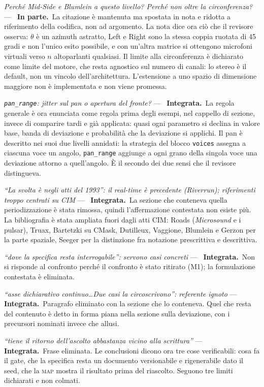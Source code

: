 \documentclass[11pt,a4paper]{article}
\newcommand{\integrata}{\textbf{Integrata.}}
\newcommand{\parziale}{\textbf{In parte.}}
\newenvironment{rilievi}
  {\begin{list}{}{%
    \setlength{\leftmargin}{1.6em}\setlength{\itemindent}{-1.6em}%
    \setlength{\itemsep}{4pt}\setlength{\parsep}{0pt}\setlength{\topsep}{4pt}}}
  {\end{list}}
\newcommand{\voce}[1]{\item \textit{#1} ---\ }
\begin{document}
\begin{rilievi}
\voce{Perché Mid-Side e Blumlein a questo livello? Perché non oltre la
circonferenza?} \parziale\ La citazione è mantenuta ma spostata in nota e
ridotta a riferimento della codifica, non ad argomento. La nota dice ora
ciò che il revisore osserva: $\theta$ è un azimuth astratto, Left e Right
sono la stessa coppia ruotata di 45 gradi e non l'unico esito possibile, e
con un'altra matrice si ottengono microfoni virtuali verso $n$ altoparlanti
qualsiasi. Il limite alla circonferenza è dichiarato come limite del motore,
che resta agnostico sul numero di canali: lo stereo è il default, non un
vincolo dell'architettura. L'estensione a uno spazio di dimensione maggiore
non è implementata e non viene promessa.

\voce{\texttt{pan\_range}: jitter sul pan o apertura del fronte?}
\integrata\ La regola generale è ora enunciata come regola prima degli
esempi, nel cappello di sezione, invece di comparire tardi e già applicata:
quasi ogni parametro si declina in valore base, banda di deviazione e
probabilità che la deviazione si applichi. Il pan è descritto nei suoi due
livelli annidati: la strategia del blocco \texttt{voices} assegna a ciascuna
voce un angolo, \texttt{pan\_range} aggiunge a ogni grano della singola voce
una deviazione attorno a quell'angolo. È il secondo dei due sensi che il
revisore distingueva.

\voce{``La svolta è negli atti del 1993'': il real-time è precedente
(Riverrun); riferimenti troppo centrati su CIM} \integrata\ La sezione che
conteneva quella periodizzazione è stata rimossa, quindi l'affermazione
contestata non esiste più. La bibliografia è stata ampliata fuori dagli atti
CIM: Roads (\emph{Microsound} e i pulsar), Truax, Bartetzki su CMask,
Dutilleux, Vaggione, Blumlein e Gerzon per la parte spaziale, Seeger per la
distinzione fra notazione prescrittiva e descrittiva.

\voce{``dove la specifica resta interrogabile'': servono casi concreti}
\integrata\ Non si risponde al confronto perché il confronto è stato
ritirato (M1); la formulazione contestata è eliminata.

\voce{``asse dichiarativo continuo\ldots Due casi la circoscrivono'':
referente ignoto} \integrata\ Paragrafo eliminato con la sezione che lo
conteneva. Quel che resta del contenuto è detto in forma piana nella sezione
sulla deviazione, con i precursori nominati invece che allusi.

\voce{``tiene il ritorno dell'ascolto abbastanza vicino alla scrittura''}
\integrata\ Frase eliminata. Le conclusioni dicono ora tre cose
verificabili: cosa fa il gate, che la specifica resta un documento
versionabile e rigenerabile dato il seed, che la \textsc{map} mostra il
risultato prima del riascolto. Seguono tre limiti dichiarati e non colmati.

\end{rilievi}
\end{document}
